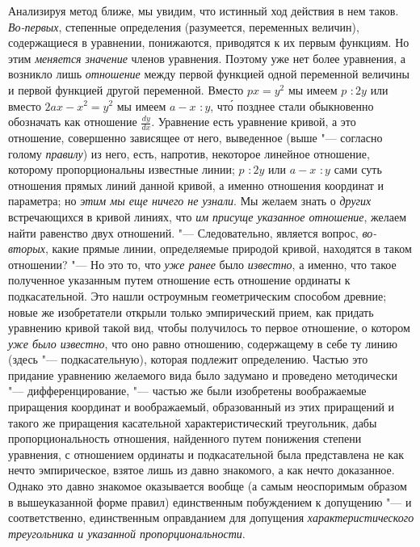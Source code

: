Анализируя метод ближе, мы увидим, что истинный ход действия в нем таков.
{\em Во-первых}, степенные определения (разумеется,
переменных величин), содержащиеся в уравнении, понижаются, приводятся к их
первым функциям. Но этим {\em меняется значение} членов
уравнения. Поэтому уже нет более уравнения, а возникло лишь
{\em отношение} между первой функцией одной переменной
величины и первой функцией другой переменной. Вместо $px=y^2$ мы
имеем $p \text{~}\colon 2y$ или вместо $2ax-x^2=y^2$ мы имеем 
$a-x \text{~}\colon y$, чт\'{о} позднее стали обыкновенно обозначать
как отношение $\frac{dy}{dx}$. Уравнение есть уравнение
кривой, а это отношение, совершенно зависящее от него, выведенное (выше
"--- согласно голому {\em правилу}) из него, есть,
напротив, некоторое линейное отношение, которому пропорциональны известные
линии; $p \text{~}\colon 2y$ или $a-x \text{~}\colon y$ сами
суть отношения прямых линий данной кривой, а именно отношения координат и
параметра; но {\em этим мы еще ничего не узнали}. Мы желаем знать о
{\em других} встречающихся в кривой линиях, что
{\em им присуще указанное отношение}, желаем найти
равенство двух отношений. "--- Следовательно, является вопрос,
{\em во-вторых}, какие прямые линии, определяемые
природой кривой, находятся в таком отношении? "--- Но это то, что
{\em уже ранее} было {\em известно}, а именно, что такое полученное
указанным путем отношение есть отношение ординаты к подкасательной. Это
нашли остроумным геометрическим способом древние; новые же изобретатели
открыли только эмпирический прием, как придать уравнению кривой такой вид,
чтобы получилось то первое отношение, о котором
{\em уже было известно}, что оно равно отношению,
содержащему в себе ту линию (здесь "--- подкасательную), которая подлежит
определению. Частью это придание уравнению желаемого вида было задумано и
проведено методически "--- дифференцирование, "--- частью же были изобретены
воображаемые приращения координат и воображаемый, образованный из этих
приращений и такого же приращения касательной характеристический
треугольник, дабы пропорциональность отношения, найденного путем понижения
степени уравнения, с отношением ординаты и подкасательной была представлена
не как нечто эмпирическое, взятое лишь из давно знакомого, а как нечто
доказанное. Однако это давно знакомое оказывается вообще (а самым
неоспоримым образом в вышеуказанной форме правил) единственным побуждением
к допущению "--- и соответственно, единственным оправданием для допущения
{\em характеристического треугольника и указанной
пропорциональности}.

